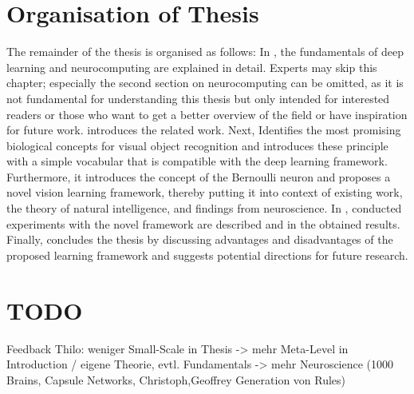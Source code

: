 \section{Organisation of Thesis}
The remainder of the thesis is organised as follows: In , the fundamentals of deep learning and neurocomputing are explained in detail.
Experts may skip this chapter; especially the second section on neurocomputing can be omitted, as it is not fundamental for understanding this thesis but only intended for interested readers or those who want to get a better overview of the field or have inspiration for future work.
 introduces the related work. Next,  Identifies the most promising biological concepts for visual object recognition and introduces these principle with a simple vocabular that is compatible with the deep learning framework.
Furthermore, it introduces the concept of the Bernoulli neuron and proposes a novel vision learning framework, thereby putting it into context of existing work, the theory of natural intelligence, and findings from neuroscience.
In , conducted experiments with the novel framework are described and in  the obtained results.
Finally,  concludes the thesis by discussing advantages and disadvantages of the proposed learning framework and suggests potential directions for future research.

\section{TODO}
Feedback Thilo: weniger Small-Scale in Thesis -> mehr Meta-Level in Introduction / eigene Theorie, evtl. Fundamentals -> mehr Neuroscience (1000 Brains, Capsule Networks, Christoph,Geoffrey Generation von Rules)





